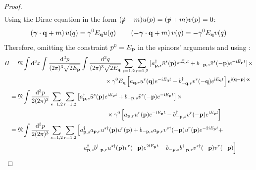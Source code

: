 \begin{proofbox}
\begin{proof}
\begin{equation*}
\begin{split}
      \end{split}
    \end{equation*}
    Using the Dirac equation in the form $ (\slashed{p} - m) u(p) = (\slashed{p} + m) v(p) = 0 $:
    \begin{equation*}
      \left( \boldsymbol{\gamma} \cdot \mathbf{q} + m \right) u(q) = \gamma^0 E_{\mathbf{q}} u(q)
      \qquad
      \left( -\boldsymbol{\gamma} \cdot \mathbf{q} + m \right) v(q) = - \gamma^0 E_{\mathbf{q}} v(q)
    \end{equation*}
    Therefore, omitting the constraint $ p^0 = E_{\mathbf{p}} $ in the spinors' arguments and using :
    \begin{equation*}
      \begin{split}
        H
        &= \normord \int \dd^3x \int \frac{\dd^3p}{(2\pi)^3 \sqrt{2E_\ve{p}}} \int \frac{\dd^3q}{(2\pi)^3 \sqrt{2E_\ve{q}}} \sum_{s = 1,2} \sum_{r = 1,2} \left[ a_{\ve{p},s}^\dagger \bar{u}^s(\ve{p}) e^{\img E_\ve{p} t} + b_{-\ve{p},s} \bar{v}^s(-\ve{p}) e^{-\img E_\ve{p} t} \right] \hspace{-0.18em} \times \\
        & \qquad \qquad \qquad \qquad \qquad \qquad \qquad \quad \ \ \times \gamma^0 E_\ve{q} \left[ a_{\ve{q},r} u^r(\ve{q}) e^{-i E_\ve{q} t} - b_{-\ve{q},r}^\dagger v^r(-\ve{q}) e^{\img E_\ve{q} t} \right] e^{\img (\ve{q} - \ve{p}) \cdot \ve{x}} \\
        &= \normord \int \frac{\dd^3p}{2(2\pi)^3} \sum_{s = 1,2} \sum_{r = 1,2} \left[ a_{\ve{p},s}^\dagger \bar{u}^s(\ve{p}) e^{\img E_\ve{p} t} + b_{-\ve{p},s} \bar{v}^s(-\ve{p}) e^{-\img E_\ve{p} t} \right] \times \\
        & \qquad \qquad \qquad \qquad \qquad \qquad \qquad \qquad \times \gamma^0 \left[ a_{\ve{p},r} u^r(\ve{p}) e^{-\img E_\ve{p} t} - b_{-\ve{p},s}^\dagger v^r(-\ve{p}) e^{\img E_\ve{p} t} \right] \\
        &= \normord \int \frac{\dd^3p}{2(2\pi)^3} \sum_{s = 1,2} \sum_{r = 1,2} \Big[ a_{\ve{p},s}^\dagger a_{\ve{p},r} u^{s\dagger}(\ve{p}) u^r(\ve{p}) + b_{-\ve{p},s} a_{\ve{p},r} v^{s\dagger}(-\ve{p}) u^r(\ve{p}) e^{-2\img E_\ve{p} t} + \\
        & \qquad \qquad \qquad \qquad \qquad \quad - a_{\ve{p},s}^\dagger b_{-\ve{p},r}^\dagger u^{s\dagger}(\ve{p}) v^r(-\ve{p}) e^{2\img E_\ve{p} t} - b_{-\ve{p},s} b_{-\ve{p},r}^\dagger v^{s\dagger}(-\ve{p}) v^r(-\ve{p}) \Big]
      \end{split}
    \end{equation*}


\end{proof}
\end{proofbox}
